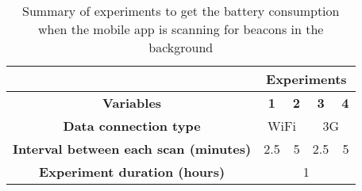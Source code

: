 \begin{table}[]
\centering
\begin{tabular}{@{}|c|c|c|c|c|@{}}
\toprule
\multicolumn{1}{|l|}{}                     & \multicolumn{4}{c|}{{\bf Experiments}}                                                                \\ \midrule
{\bf Variables}                            & {\bf 1}                  & {\bf 2}                & {\bf 3}                  & {\bf 4}                \\ \midrule
{\bf Data connection type}                 & \multicolumn{2}{c|}{WiFi}                         & \multicolumn{2}{c|}{3G}                           \\ \midrule
{\bf Interval between each scan (minutes)} & \multicolumn{1}{r|}{2.5} & \multicolumn{1}{r|}{5} & \multicolumn{1}{r|}{2.5} & \multicolumn{1}{r|}{5} \\ \midrule
{\bf Experiment duration (hours)}          & \multicolumn{4}{c|}{1}                                                                                \\ \bottomrule
\end{tabular}
\caption{Summary of experiments to get the battery consumption when the mobile
app is scanning for beacons in the background}
\label{tab:experiments_battery}
\end{table}
